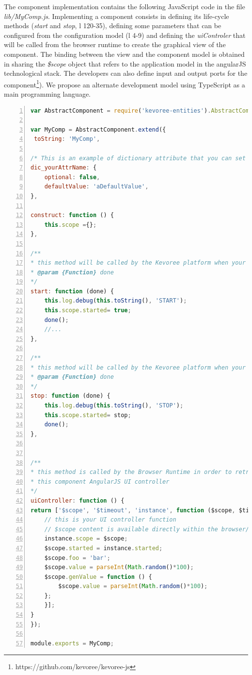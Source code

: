 The component implementation contains the following JavaScript code in the file \emph{lib/MyComp.js}. Implementing a component consists in defining its life-cycle methods (\emph{start} and \emph{stop}, l 120-35), defining some parameters that can be configured from the configuration model (l 4-9) and defining the \emph{uiControler} that will be called from the browser runtime to create the graphical view of the component. The binding between the view and the component model is obtained in sharing the \emph{\$scope} object  that refers to the application model in the angularJS technological stack. The developers can also define input and output ports for the component\footnote{https://github.com/kevoree/kevoree-js}). We propose an alternate development model using TypeScript as a main programming language. 



\begin{lstlisting}[language=JavaScript,numbers=left,firstnumber=1,basicstyle=\scriptsize,deletekeywords={port},frame=none,caption={Excerpt of the component implementation}]
var AbstractComponent = require('kevoree-entities').AbstractComponent;

var MyComp = AbstractComponent.extend({
 toString: 'MyComp',

/* This is an example of dictionary attribute that you can set for your entity */
dic_yourAttrName: {
	optional: false,
	defaultValue: 'aDefaultValue',
},

construct: function () {
	this.scope ={};
},

/**
* this method will be called by the Kevoree platform when your component has to start
* @param {Function} done
*/
start: function (done) {
	this.log.debug(this.toString(), 'START');
	this.scope.started= true;
	done();
	//...
},

/**
* this method will be called by the Kevoree platform when your component has to stop
* @param {Function} done
*/
stop: function (done) {
	this.log.debug(this.toString(), 'STOP');
	this.scope.started= stop;
	done();
},


/**
* this method is called by the Browser Runtime in order to retrieve
* this component AngularJS UI controller
*/
uiController: function () {
return ['$scope', '$timeout', 'instance', function ($scope, $timeout, instance) {
	// this is your UI controller function
	// $scope content is available directly within the browser/kevoree-comp-foocomp.html file
	instance.scope = $scope;
	$scope.started = instance.started;
	$scope.foo = 'bar';
	$scope.value = parseInt(Math.random()*100);
	$scope.genValue = function () {
		$scope.value = parseInt(Math.random()*100);
	};
	}];
}
});

module.exports = MyComp;
\end{lstlisting}


